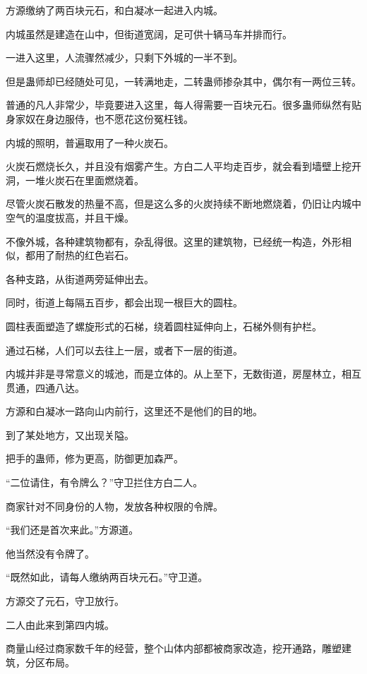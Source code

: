 
\begin{this_body}

方源缴纳了两百块元石，和白凝冰一起进入内城。

内城虽然是建造在山中，但街道宽阔，足可供十辆马车并排而行。

一进入这里，人流骤然减少，只剩下外城的一半不到。

但是蛊师却已经随处可见，一转满地走，二转蛊师掺杂其中，偶尔有一两位三转。

普通的凡人非常少，毕竟要进入这里，每人得需要一百块元石。很多蛊师纵然有贴身家奴在身边服侍，也不愿花这份冤枉钱。

内城的照明，普遍取用了一种火炭石。

火炭石燃烧长久，并且没有烟雾产生。方白二人平均走百步，就会看到墙壁上挖开洞，一堆火炭石在里面燃烧着。

尽管火炭石散发的热量不高，但是这么多的火炭持续不断地燃烧着，仍旧让内城中空气的温度拔高，并且干燥。

不像外城，各种建筑物都有，杂乱得很。这里的建筑物，已经统一构造，外形相似，都用了耐热的红色岩石。

各种支路，从街道两旁延伸出去。

同时，街道上每隔五百步，都会出现一根巨大的圆柱。

圆柱表面塑造了螺旋形式的石梯，绕着圆柱延伸向上，石梯外侧有护栏。

通过石梯，人们可以去往上一层，或者下一层的街道。

内城并非是寻常意义的城池，而是立体的。从上至下，无数街道，房屋林立，相互贯通，四通八达。

方源和白凝冰一路向山内前行，这里还不是他们的目的地。

到了某处地方，又出现关隘。

把手的蛊师，修为更高，防御更加森严。

“二位请住，有令牌么？”守卫拦住方白二人。

商家针对不同身份的人物，发放各种权限的令牌。

“我们还是首次来此。”方源道。

他当然没有令牌了。

“既然如此，请每人缴纳两百块元石。”守卫道。

方源交了元石，守卫放行。

二人由此来到第四内城。

商量山经过商家数千年的经营，整个山体内部都被商家改造，挖开通路，雕塑建筑，分区布局。


\end{this_body}
